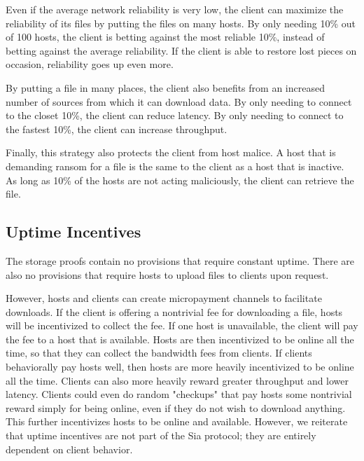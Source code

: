 \documentclass[twocolumn]{article}
\begin{document}
Even if the average network reliability is very low, the client can maximize the reliability of its files by putting the files on many hosts.
By only needing 10\% out of 100 hosts, the client is betting against the most reliable 10\%, instead of betting against the average reliability.
If the client is able to restore lost pieces on occasion, reliability goes up even more.

By putting a file in many places, the client also benefits from an increased number of sources from which it can download data.
By only needing to connect to the closet 10\%, the client can reduce latency.
By only needing to connect to the fastest 10\%, the client can increase throughput.

Finally, this strategy also protects the client from host malice.
A host that is demanding ransom for a file is the same to the client as a host that is inactive.
As long as 10\% of the hosts are not acting maliciously, the client can retrieve the file.

\subsection{Uptime Incentives}
The storage proofs contain no provisions that require constant uptime.
There are also no provisions that require hosts to upload files to clients upon request.

However, hosts and clients can create micropayment channels to facilitate downloads.
If the client is offering a nontrivial fee for downloading a file, hosts will be incentivized to collect the fee.
If one host is unavailable, the client will pay the fee to a host that is available.
Hosts are then incentivized to be online all the time, so that they can collect the bandwidth fees from clients.
If clients behaviorally pay hosts well, then hosts are more heavily incentivized to be online all the time.
Clients can also more heavily reward greater throughput and lower latency.
Clients could even do random "checkups" that pay hosts some nontrivial reward simply for being online, even if they do not wish to download anything.
This further incentivizes hosts to be online and available.
However, we reiterate that uptime incentives are not part of the Sia protocol; they are entirely dependent on client behavior.

\end{document}
